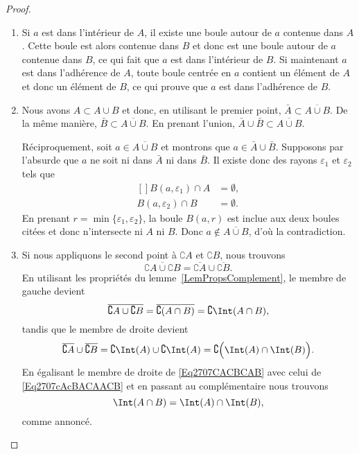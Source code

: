 \begin{proof}
	\begin{enumerate}
		\item
		      Si $a$ est dans l'intérieur de $A$, il existe une boule autour de $a$ contenue dans $A$. Cette boule est alors contenue dans $B$ et donc est une boule autour de $a$ contenue dans $B$, ce qui fait que $a$ est dans l'intérieur de $B$. Si maintenant $a$ est dans l'adhérence de $A$, toute boule centrée en $a$ contient un élément de $A$ et donc un élément de $B$, ce qui prouve que $a$ est dans l'adhérence de $B$.
		\item
		      Nous avons $A\subset A\cup B$ et donc, en utilisant le premier point, $\bar A\subset\overline{ A\cup B }$. De la même manière, $\bar B\subset\overline{ A\cup B }$. En prenant l'union, $\bar A\cup\bar B\subset\overline{ A\cup B }$.

		      Réciproquement, soit $a\in\overline{ A\cup B }$ et montrons que $a\in\bar A\cup\bar B$. Supposons par l'absurde que $a$ ne soit ni dans $\bar A$ ni dans $\bar B$. Il existe donc des rayons $\varepsilon_1$ et $\varepsilon_2$ tels que
		      \begin{equation}
			      \begin{aligned}[]
				      B(a,\varepsilon_1)\cap A & =\emptyset, \\
				      B(a,\varepsilon_2)\cap B & =\emptyset.
			      \end{aligned}
		      \end{equation}
		      En prenant $r=\min\{ \varepsilon_1,\varepsilon_2 \}$, la boule $B(a,r)$ est inclue aux deux boules citées et donc n'intersecte ni $A$ ni $B$. Donc $a\notin\overline{ A\cup B }$, d'où la contradiction.

		\item
		      Si nous appliquons le second point à $\complement A$ et $\complement B$, nous trouvons
		      \begin{equation}
			      \overline{ \complement A\cup\complement B }=\overline{ \complement A}\cup\overline{ \complement B}.
		      \end{equation}
		      En utilisant les propriétés du lemme~\ref{LemPropsComplement}, le membre de gauche devient
		      \begin{equation}	\label{Eq2707CACBCAB}
			      \overline{ \complement A\cup\complement B }=\overline{ \complement(A\cap B) }=\complement\Int(A\cap B),
		      \end{equation}
		      tandis que le membre de droite devient
		      \begin{equation}		\label{Eq2707cAcBACAACB}
			      \overline{ \complement A }\cup\overline{ \complement B }=\complement\Int(A)\cup\complement\Int(A)=\complement\Big( \Int(A)\cap\Int(B) \Big).
		      \end{equation}
		      En égalisant le membre de droite de \eqref{Eq2707CACBCAB} avec celui de \eqref{Eq2707cAcBACAACB} et en passant au complémentaire nous trouvons
		      \begin{equation}
			      \Int(A\cap B)=\Int(A)\cap\Int(B),
		      \end{equation}
		      comme annoncé.


\end{enumerate}
\end{proof}

